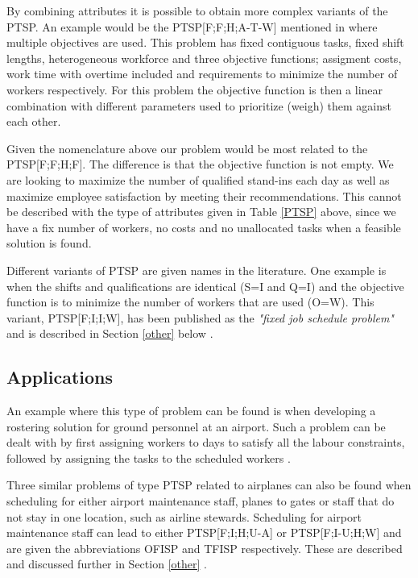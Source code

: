 By combining attributes it is possible to obtain more complex variants of the PTSP. An example would be the PTSP[F;F;H;A-T-W] mentioned in \cite{krishnamoorthy_2001} where multiple objectives are used. This problem has fixed contiguous tasks, fixed shift lengths, heterogeneous workforce and three objective functions; assigment costs, work time with overtime included and requirements to minimize the number of workers respectively. For this problem the objective function is then a linear combination with different parameters used to prioritize (weigh) them against each other.

Given the nomenclature above our problem would be most related to the PTSP[F;F;H;F]. The difference is that the objective function is not empty. We are looking to maximize the number of qualified stand-ins each day as well as maximize employee satisfaction by meeting their recommendations. This cannot be described with the type of attributes given in Table \ref{PTSP} above, since we have a fix number of workers, no costs and no unallocated tasks when a feasible solution is found. 

Different variants of PTSP are given names in the literature. One example is when the shifts and qualifications are identical (S=I and Q=I) and the objective function is to minimize the number of workers that are used (O=W). This variant, PTSP[F;I;I;W], has been published as the \textit{"fixed job schedule problem"} and is described in Section \ref{other} below \cite{krishnamoorthy_2001}.

\subsection{Applications}
An example where this type of problem can be found is when developing a rostering solution for ground personnel at an airport. Such a problem can be dealt with by first assigning workers to days to satisfy all the labour constraints, followed by assigning the tasks to the scheduled workers \cite{krishnamoorthy_2001}.

Three similar problems of type PTSP related to airplanes can also be found when scheduling for either airport maintenance staff, planes to gates or staff that do not stay in one location, such as airline stewards. Scheduling for airport maintenance staff can lead to either PTSP[F;I;H;U-A] or PTSP[F;I-U;H;W] and are given the abbreviations OFISP and TFISP respectively. These are described and discussed further in Section \ref{other} \cite{krishnamoorthy_2001}. 

